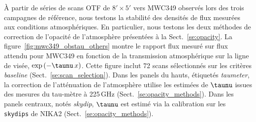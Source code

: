 \`A partir de séries de scans OTF de $8' \times 5'$ vers MWC349
observés lors des trois campagnes de référence, nous testons la
stabilité des densités de flux mesurées aux conditions
atmosphériques. En particulier, nous testons les deux méthodes de
correction de l'opacité de l'atmosphère présentées à la
Sect.~\ref{se:opacity}. La figure~\ref{fig:mwc349_obstau_others}
montre le rapport flux mesuré sur flux attendu pour MWC349 en fonction
de la transmission atmosphérique sur la ligne de visée,
$\exp{(-\taunu \, x)}$. Cette figure inclut 72 scans sélectionnés sur
les critères \emph{baseline} (Sect.~\ref{se:scan_selection}). Dans les
panels du hauts, étiquetés \emph{taumeter}, la correction de
l'atténuation de l'atmosphère utilise les estimées de $\taunu$ issues
des mesures du tau-mètre à 225\,GHz
(Sect.~\ref{se:opacity_methods}). Dans les panels centraux, notés
\emph{skydip}, $\taunu$ est estimé via la calibration sur
les {\tt skydips} de NIKA2 (Sect.~\ref{se:opacity_methods}).  
%
